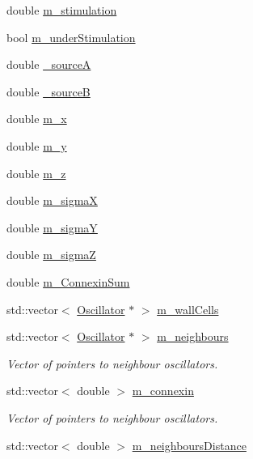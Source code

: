 \begin{DoxyCompactItemize}
\item 
double \hyperlink{class_oscillator_afc8f8dc1e06529009d1919a74c92f5f3}{m\+\_\+stimulation}
\item 
bool \hyperlink{class_oscillator_aeaa03f804f9d13f27635b94ea7a6bd32}{m\+\_\+under\+Stimulation}
\item 
double \hyperlink{class_oscillator_a968627d069d5f0c44d8134718a01237f}{\+\_\+source\+A}
\item 
double \hyperlink{class_oscillator_a5a144fd5dd7cbcbfc47d7c9013d330b8}{\+\_\+source\+B}
\item 
double \hyperlink{class_oscillator_abd8b2a7267f85cae787a0bc77d1f5a5a}{m\+\_\+x}
\item 
double \hyperlink{class_oscillator_a6936c789a75680f0486c817af4fce202}{m\+\_\+y}
\item 
double \hyperlink{class_oscillator_ae00491a4783797fb6edb9c3d5317a6ad}{m\+\_\+z}
\item 
double \hyperlink{class_oscillator_aa0fe6259ca35433e3bd0dbac2d0ead65}{m\+\_\+sigma\+X}
\item 
double \hyperlink{class_oscillator_a253c7652df4789833c9f940c3278036d}{m\+\_\+sigma\+Y}
\item 
double \hyperlink{class_oscillator_af8ba90eb71c73ac1c789d569e7e2f92f}{m\+\_\+sigma\+Z}
\item 
double \hyperlink{class_oscillator_a952e781ffe848b06b7b511c54f1d090c}{m\+\_\+\+Connexin\+Sum}
\item 
std\+::vector$<$ \hyperlink{class_oscillator}{Oscillator} $\ast$ $>$ \hyperlink{class_oscillator_a74e09a4970c7dff6fd51e99cd399ff22}{m\+\_\+wall\+Cells}
\item 
std\+::vector$<$ \hyperlink{class_oscillator}{Oscillator} $\ast$ $>$ \hyperlink{class_oscillator_ac6add7bad19c62071ad1ce651b815e4e}{m\+\_\+neighbours}
\begin{DoxyCompactList}\small\item\em Vector of pointers to neighbour oscillators. \end{DoxyCompactList}\item 
std\+::vector$<$ double $>$ \hyperlink{class_oscillator_a94d86971a2a425d2e2492962491dc01b}{m\+\_\+connexin}
\begin{DoxyCompactList}\small\item\em Vector of pointers to neighbour oscillators. \end{DoxyCompactList}\item 
std\+::vector$<$ double $>$ \hyperlink{class_oscillator_a7031173912bc2225997a3ab6f9995fec}{m\+\_\+neighbours\+Distance}

\end{DoxyCompactItemize}
